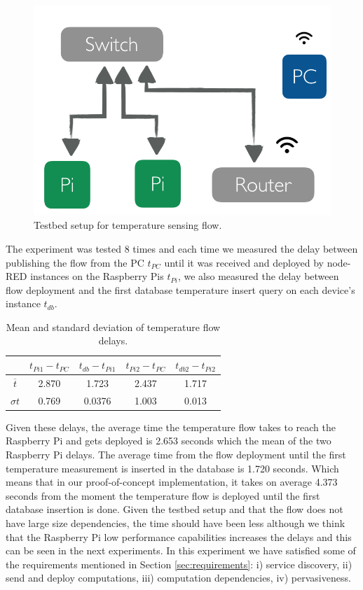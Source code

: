  \begin{figure}[H]
	\centering
	\includegraphics[scale=0.6]{images/tb-temp.png}
	\caption{Testbed setup for temperature sensing flow.}
	\label{fig:tb-temp}
\end{figure} 

\noindent The experiment was tested 8 times and each time  we measured the delay between publishing the flow from the PC $ t_{PC}$ until it was received and deployed by  node-RED instances on the Raspberry Pis $t_{Pi}$, we also measured the delay between flow deployment and the first database temperature insert query on each device's instance $t_{db}$. 
\begin{table}[H]
	\centering
	\begin{tabular}{c|c|c|c|c}\toprule
		&  $ t_{Pi1} - t_{PC}$   & $t_{db} - t_{Pi1}$  & $ t_{Pi2} - t_{PC}$ &  $t_{db2} - t_{Pi2}$ \\ \midrule
$ \overline{t} $ &2.870&	1.723&	2.437&	1.717\\
$ \sigma t $& 0.769	&0.0376&	1.003&	0.013\\
	\end{tabular}
	\caption{Mean and standard deviation of temperature flow delays.}
	\label{table:temp}
\end{table}

\noindent Given these delays, the average time the temperature flow takes to reach the Raspberry Pi and gets deployed is 2.653 seconds which the mean of the two Raspberry Pi delays. The average time from the flow deployment  until the first temperature measurement is inserted in the database    is 1.720 seconds. Which means that in our proof-of-concept implementation, it takes on average 4.373 seconds from the moment 
the temperature flow is deployed until the first database  insertion is done. Given the testbed setup and that the flow does not have large size dependencies, the time should have been less although we think that the Raspberry Pi  low performance capabilities increases the delays and this can be seen in the next experiments.  In this experiment we have satisfied some of the requirements mentioned in  Section \ref{sec:requirements}: i) service discovery, ii) send and deploy computations, iii) computation dependencies, iv) pervasiveness.

